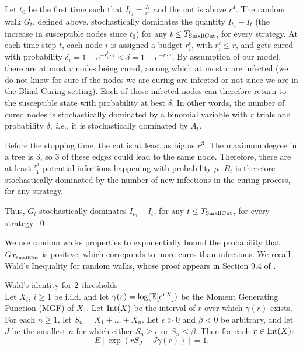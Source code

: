 \begin{lemma} \label{lem:RW} 
Let $t_0$ be the first time such that $I_{t_0} = \frac{N}{r^4}$ and the cut is above $r^4$. The random walk $G_t$, defined above, stochastically dominates the quantity $I_{t_0} - I_t$ (the increase in susceptible nodes since $t_0$) for any $t \leq T_{\rm Small Cut}$,  for every strategy.
\proof At each time step $t$, each node $i$ is assigned a budget $r_i^t$, with $r_i^t \leq r$, and gets cured with probability $\delta_i = 1- e^{-r_i^t \cdot \tau} \leq \delta = 1 - e^{-r \cdot \tau} $. By assumption of our model, there are at most $r$ nodes being cured, among which at most $r$ are infected (we do not know for sure if the nodes we are curing are infected or not since we are in the Blind Curing setting). Each of these infected nodes can therefore return to the susceptible state with probability at best $\delta$. In other words, the number of cured nodes is stochastically dominated by a binomial variable with $r$ trials and probability $\delta$, \textit{i.e.,} it is stochastically dominated by $A_t$.

Before the stopping time, the cut is at least as big as $r^3$. The maximum degree in a tree is 3, so 3 of these edges could lead to the same node. Therefore, there are at least $\frac{r^3}{3}$ potential infections happening with probability $\mu$. $B_t$ is therefore stochastically dominated by the number of new infections in the curing process, for any strategy. 

Thus, $G_t$ stochastically dominates $I_{t_0} - I_t$, for any $t \leq T_{\rm Small Cut}$, for every strategy.
\qed 
\end{lemma}

We use random walks properties to exponentially bound the probability that $G_{T_{\rm Small Cut}}$ is positive, which correponds to more cures than infections. We recall Wald's Inequality for random walks, whose proof appears in Section 9.4 of \cite{Gallager2013}.

\begin{theorem} {Wald's identity for 2 thresholds}  \label{th:wald2} \\
Let $X_i$, $i \geq 1$ be i.i.d. and let $\gamma(r) = \log(\mathbb{E}[e^{rX}])$ be the Moment Generating Function (MGF) of $X_1$. Let ${\rm Int}(X)$ be the interval of $r$ over which $\gamma(r)$ exists. For each $n \geq 1$, let $S_n = X_1 + \dots +X_n$. Let $\epsilon > 0$ and $\beta < 0$ be arbitrary, and let $J$ be the smallest $n$ for which either $S_n \geq \epsilon$ or $S_n \leq \beta$. Then for each $r \in {\rm Int}(X)$:
\[E[\exp(rS_J -J{\gamma}(r))] = 1. \]
\end{theorem}

